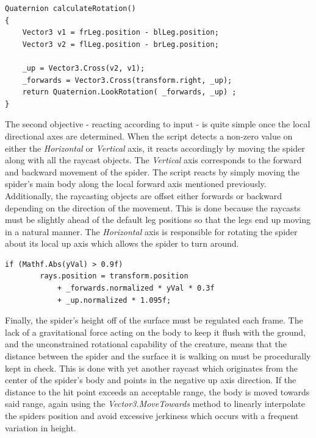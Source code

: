 \begin{lstlisting}[basicstyle=\linespread{0.9}\footnotesize\ttfamily, numbers=none,frame=single,
caption={Calculating the spider's rotation.
\textit{IKSpiderMovement.cs}},captionpos=t, label=rotation, language={[Sharp]c},
float=tp]
Quaternion calculateRotation()
{
    Vector3 v1 = frLeg.position - blLeg.position;
    Vector3 v2 = flLeg.position - brLeg.position;
    
    _up = Vector3.Cross(v2, v1);
    _forwards = Vector3.Cross(transform.right, _up);
    return Quaternion.LookRotation( _forwards, _up) ;
}
\end{lstlisting}


The second objective - reacting according to input - is quite simple once the
local directional axes are determined. When the script detects a non-zero value
on either the \textit{Horizontal} or \textit{Vertical} axis, it reacts
accordingly by moving the spider along with all the raycast objects. The
\textit{Vertical} axis corresponds to the forward and backward movement of the
spider. The script reacts by simply moving the spider's main body along the
local forward axis mentioned previously. Additionally, the raycasting objects
are offset either forwards or backward depending on the direction of the
movement. This is done because the raycasts must be slightly ahead of the
default leg positions so that the legs end up moving in a natural manner.
The \textit{Horizontal} axis is responsible for rotating the spider about its
local up axis which allows the spider to turn around. 

\begin{lstlisting}[basicstyle=\linespread{0.9}\footnotesize\ttfamily, numbers=none,frame=single,
caption={The raycasts which scan the terrain for leg placement positions are
offset in the direction in which the spider is walking. The \textit{yVal}
variable is the value of the \textit{Vertical} axis input. \textit{IKSpiderMovement.cs}},captionpos=t,
label=ray_offset, language={[Sharp]c}, float=tp]
    if (Mathf.Abs(yVal) > 0.9f)
        rays.position = transform.position
            + _forwards.normalized * yVal * 0.3f
            + _up.normalized * 1.095f;
\end{lstlisting}

Finally, the spider's height off of the surface must be regulated each frame.
The lack of a gravitational force acting on the body to keep it flush with the
ground, and the unconstrained rotational capability of the creature, means that
the distance between the spider and the surface it is walking on must be
procedurally kept in check. This is done with yet another raycast which
originates from the center of the spider's body and points in the negative up
axis direction. If the distance to the hit point exceeds an acceptable range,
the body is moved towards said range, again using the
\textit{Vector3.MoveTowards} method to linearly interpolate the spiders position
and avoid excessive jerkiness which occurs with a frequent variation in height. 



